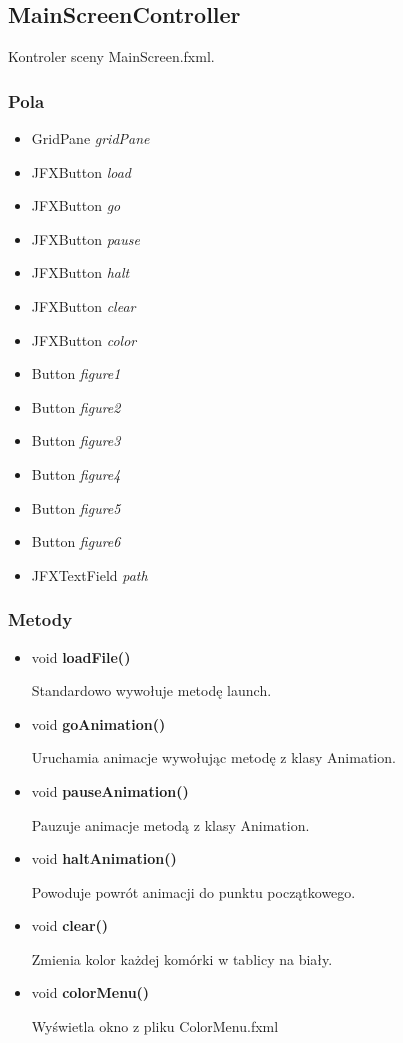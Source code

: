 \documentclass[a4paper,11pt]{article}
\begin{document}
\subsection{MainScreenController}
Kontroler sceny MainScreen.fxml.
\subsubsection{Pola}
\begin{itemize}
\item GridPane \textit{gridPane}
\item JFXButton \textit{load}
\item JFXButton \textit{go}
\item JFXButton \textit{pause}
\item JFXButton \textit{halt}
\item JFXButton \textit{clear}
\item JFXButton \textit{color}
\item Button \textit{figure1}
\item Button \textit{figure2}
\item Button \textit{figure3}
\item Button \textit{figure4}
\item Button \textit{figure5}
\item Button \textit{figure6}
\item JFXTextField \textit{path}
\end{itemize}
\subsubsection{Metody}
\begin{itemize}
\item void \textbf{loadFile()}

Standardowo wywołuje metodę launch.
\item void \textbf{goAnimation()}

Uruchamia animacje wywołując metodę z klasy Animation.
\item void \textbf{pauseAnimation()}

Pauzuje animacje metodą z klasy Animation.
\item void \textbf{haltAnimation()}

Powoduje powrót animacji do punktu początkowego.
\item void \textbf{clear()}

Zmienia kolor każdej komórki w tablicy na biały.
\item void \textbf{colorMenu()}

Wyświetla okno z pliku ColorMenu.fxml
\end{itemize}
\end{document}

